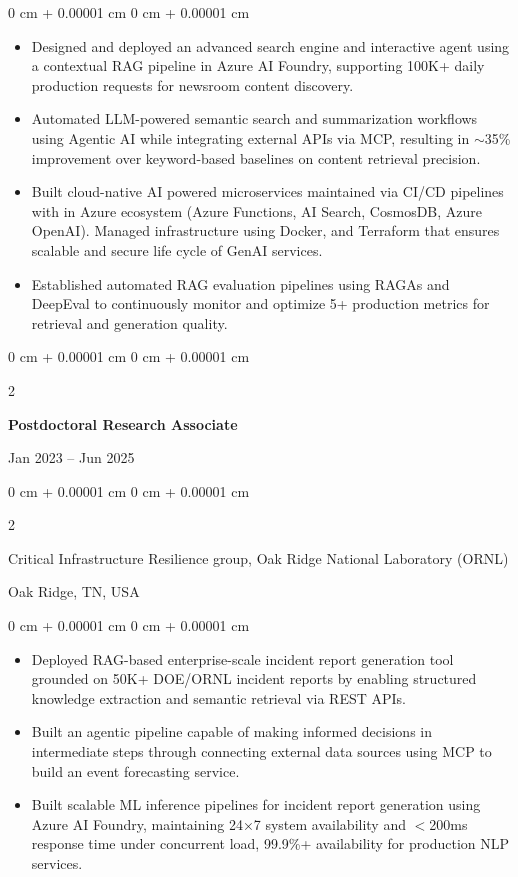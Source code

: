 \documentclass[10pt, letterpaper]{article}
\newenvironment{highlights}{
    \begin{itemize}[
        topsep=0.10 cm,
        parsep=0.10 cm,
        partopsep=0pt,
        itemsep=0pt,
        leftmargin=0 cm + 10pt
    ]
}{
    \end{itemize}
} %
\newenvironment{onecolentry}{
    \begin{adjustwidth}{
        0 cm + 0.00001 cm
    }{
        0 cm + 0.00001 cm
    }
}{
    \end{adjustwidth}
} %
\newenvironment{twocolentry}[2][]{
    \onecolentry
    \def\secondColumn{#2}
    \setcolumnwidth{\fill, 4.5 cm}
    \begin{paracol}{2}
}{
    \switchcolumn \raggedleft \secondColumn
    \end{paracol}
    \endonecolentry
} %
\begin{document}
    \begin{onecolentry}
        \begin{highlights}
            \item Designed and deployed an advanced search engine and interactive agent using a contextual RAG pipeline in Azure AI Foundry, supporting 100K+ daily production requests for newsroom content discovery.
            \item Automated LLM-powered semantic search and summarization workflows using Agentic AI while integrating  external APIs via MCP, resulting in $\sim$35\% improvement over keyword-based baselines on content retrieval precision.
            \item Built cloud-native AI powered microservices maintained via CI/CD pipelines with in Azure ecosystem (Azure Functions, AI Search, CosmosDB, Azure OpenAI). Managed infrastructure using Docker, and Terraform that ensures scalable and secure life cycle of GenAI services.
            \item Established automated RAG evaluation pipelines using RAGAs and DeepEval to continuously monitor and optimize 5+ production metrics for retrieval and generation quality.
        \end{highlights}
    \end{onecolentry}

\vspace{1mm}

    \begin{twocolentry}{Jan 2023 -- Jun 2025}
        \textbf{Postdoctoral Research Associate}
    \end{twocolentry}
    \begin{twocolentry}{Oak Ridge, TN, USA}
        Critical Infrastructure Resilience group, Oak Ridge National Laboratory (ORNL)
    \end{twocolentry}
    \vspace{0.10 cm}
    \begin{onecolentry}
        \begin{highlights}
            \item Deployed RAG-based enterprise-scale incident report generation tool grounded on 50K+ DOE/ORNL incident reports by enabling structured knowledge extraction and semantic retrieval via REST APIs.
            \item Built an agentic pipeline capable of making informed decisions in intermediate steps through connecting external data sources using MCP to build an event forecasting service. 
            \item Built scalable ML inference pipelines for incident report generation using Azure AI Foundry, maintaining 24×7 system availability and $<$200ms response time under concurrent load, 99.9\%+ availability for production NLP services.
        \end{highlights}
    \end{onecolentry}
\end{document}
